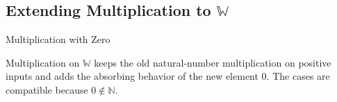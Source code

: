 
\subsection{Extending Multiplication to \texorpdfstring{$\mathbb{W}$}{W}}
\label{sec:extending-multiplication-to-w}
\begin{topicbox}{Multiplication with Zero}
\begin{exposition}
Multiplication on $\mathbb{W}$ keeps the old natural-number multiplication
on positive inputs and adds the absorbing behavior of the new element $0$.
The cases are compatible because $0\notin\mathbb{N}$.
\end{exposition}
\end{topicbox}
